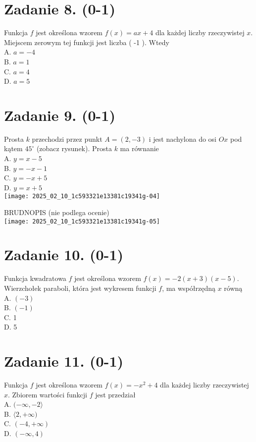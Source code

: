 \documentclass[10pt]{article}
\begin{document}
\section*{Zadanie 8. (0-1)}
Funkcja \(f\) jest określona wzorem \(f(x)=a x+4\) dla każdej liczby rzeczywistej \(x\). Miejscem zerowym tej funkcji jest liczba ( -1 ). Wtedy\\
A. \(a=-4\)\\
B. \(a=1\)\\
C. \(a=4\)\\
D. \(a=5\)

\section*{Zadanie 9. (0-1)}
Prosta \(k\) przechodzi przez punkt \(A=(2,-3)\) i jest nachylona do osi \(O x\) pod kątem \(45^{\circ}\) (zobacz rysunek). Prosta \(k\) ma równanie\\
A. \(y=x-5\)\\
B. \(y=-x-1\)\\
C. \(y=-x+5\)\\
D. \(y=x+5\)\\
\texttt{[image: 2025\_02\_10\_1c593321e13381c19341g-04]}

BRUDNOPIS (nie podlega ocenie)\\
\texttt{[image: 2025\_02\_10\_1c593321e13381c19341g-05]}

\section*{Zadanie 10. (0-1)}
Funkcja kwadratowa \(f\) jest określona wzorem \(f(x)=-2(x+3)(x-5)\). Wierzchołek paraboli, która jest wykresem funkcji \(f\), ma współrzędną \(x\) równą\\
A. \((-3)\)\\
B. \((-1)\)\\
C. 1\\
D. 5

\section*{Zadanie 11. (0-1)}
Funkcja \(f\) jest określona wzorem \(f(x)=-x^{2}+4\) dla każdej liczby rzeczywistej \(x\). Zbiorem wartości funkcji \(f\) jest przedział\\
A. \((-\infty,-2\rangle\)\\
B. \(\langle 2,+\infty)\)\\
C. \((-4,+\infty)\)\\
D. \((-\infty, 4)\)
\end{document}
